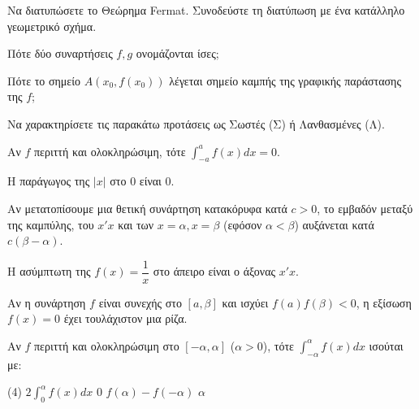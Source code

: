 \documentclass[11pt,a4paper]{article}
\newcommand{\kerkissans}[1]{{\fontfamily{maksf}\selectfont \textbf{#1}}}
\renewcommand{\textdexiakeraia}{}
\newcommand{\dint}{\displaystyle\int}
\newcommand\themanum{A}
\newcounter{thema}[section]
\renewcommand{\thethema}{\arabic{thema}}
\newcommand{\Thema}{\refstepcounter{thema}{\textbf{\textcolor{black}{\faPenSquare\ \  \large \kerkissans{\textbf{\thethemaο\hspace{2mm}Διαγώνισμα - Θέμα \themanum}}}}}\hspace{0mm}}{}
\newenvironment{thema}[1]
{\begin{tcolorbox}[title=\Thema\kerkissans{\textbf{\large{  #1}}},breakable,
enhanced standard,titlerule=0pt,toprule=0pt, rightrule=0pt, bottomrule=0pt,
colback=white,left=0mm,top=1mm,bottom=0mm,
boxrule=0pt,
colframe=white,leftrule=0mm,sharp corners,coltitle=black]
\renewcommand{\themanum}{#1}}
{\end{tcolorbox}}
\begin{document}
\begin{thema}{A}
\begin{erwthma}
    \item Να διατυπώσετε το Θεώρημα Fermat. Συνοδεύστε τη διατύπωση με ένα κατάλληλο γεωμετρικό σχήμα.
    \item Πότε δύο συναρτήσεις $f, g$ ονομάζονται ίσες;
    \item Πότε το σημείο $A(x_0, f(x_0))$ λέγεται σημείο καμπής της γραφικής παράστασης της $f$;
    \item Να χαρακτηρίσετε τις παρακάτω προτάσεις ως Σωστές (Σ) ή Λανθασμένες (Λ).
    \begin{alist}
        \item Αν $f$ περιττή και ολοκληρώσιμη, τότε $\dint_{-a}^a f(x) dx = 0$.
        \item Η παράγωγος της $|x|$ στο 0 είναι 0.
        \item Αν μετατοπίσουμε μια θετική συνάρτηση κατακόρυφα κατά $c>0$, το εμβαδόν μεταξύ της καμπύλης, του $x'x$ και των $x=\alpha, x=\beta$ (εφόσον $\alpha<\beta$) αυξάνεται κατά $c(\beta-\alpha)$.
        \item H ασύμπτωτη της $f(x)=\dfrac{1}{x}$ στο άπειρο είναι ο άξονας $x'x$.
        \item Αν η συνάρτηση $f$ είναι συνεχής στο $[a, \beta]$ και ισχύει $f(a)f(\beta)<0$, η εξίσωση $f(x)=0$ έχει τουλάχιστον μια ρίζα.
    \end{alist}
    \item Αν $f$ περιττή και ολοκληρώσιμη στο $[-\alpha, \alpha]$ ($\alpha > 0$), τότε $\dint_{-\alpha}^{\alpha} f(x) dx$ ισούται με:
    \begin{tasks}[label=\let\textdexiakeraia\relax\alph*.](4)
        \task $2 \dint_0^\alpha f(x)dx$
        \task $0$
        \task $f(\alpha) - f(-\alpha)$
        \task $\alpha$
    \end{tasks}
\end{erwthma}
\end{thema}
\vspace{1cm}
\end{document}
